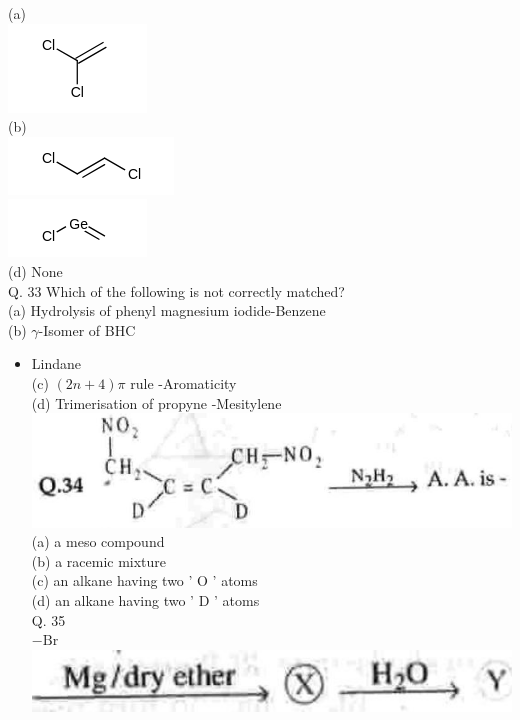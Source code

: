 \documentclass[10pt]{article}
\begin{document}
(a)\\
\includegraphics{smile-53278e8f0e038ef45d2579d47e94c5ca732676ad}\\
(b)\\
\includegraphics{smile-bad0b765218eaae9d997a740a78c1157f9483a7f}\\
\includegraphics{smile-7c2599c7eebbc2fcae0fb5528a8fab8e3a1c9ca1}\\
(d) None\\
Q. 33 Which of the following is not correctly matched?\\
(a) Hydrolysis of phenyl magnesium iodide-Benzene\\
(b) $\gamma$-Isomer of BHC

\begin{itemize}
  \item Lindane\\
(c) $(2 n+4) \pi$ rule -Aromaticity\\
(d) Trimerisation of propyne -Mesitylene\\
\includegraphics[max width=\textwidth, center]{2025_01_28_8470952b98110cec3aabg-231(1)}\\
(a) a meso compound\\
(b) a racemic mixture\\
(c) an alkane having two ' O ' atoms\\
(d) an alkane having two ' D ' atoms\\
Q. 35\\
$-\mathrm{Br}$\\
\includegraphics[max width=\textwidth, center]{2025_01_28_8470952b98110cec3aabg-231(2)}
\end{itemize}
\end{document}
